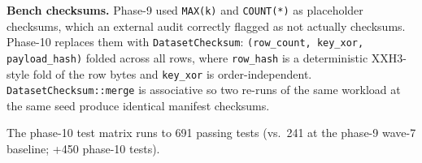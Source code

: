 \textbf{Bench checksums.} Phase-9 used \texttt{MAX(k)} and
\texttt{COUNT(*)} as placeholder checksums, which an external audit
correctly flagged as not actually checksums. Phase-10 replaces them
with \texttt{DatasetChecksum}: \texttt{(row\_count, key\_xor,
payload\_hash)} folded across all rows, where \texttt{row\_hash} is
a deterministic XXH3-style fold of the row bytes and \texttt{key\_xor}
is order-independent. \texttt{DatasetChecksum::merge} is associative
so two re-runs of the same workload at the same seed produce
identical manifest checksums.

The phase-10 test matrix runs to 691 passing tests (vs.\ 241 at the
phase-9 wave-7 baseline; +450 phase-10 tests).
